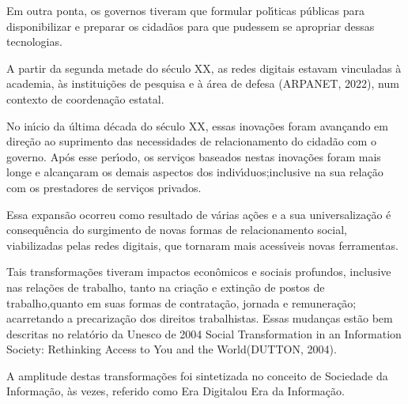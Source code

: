 \documentclass[
12pt,		%
openright,	%
twoside,  %
a4paper,			%
chapter=TITLE,		%
english,			%
french,				%
spanish,			%
brazil				%
]{USPSC-classe/USPSC}
\begin{document}
Em outra ponta, os governos tiveram que formular pol\'{\i}ticas p\'ublicas para disponibilizar e preparar os cidad\~aos para que pudessem se apropriar dessas tecnologias.








A partir da segunda metade do s\'eculo XX, as redes digitais estavam vinculadas \`a academia, \`as institui\c{c}\~oes de pesquisa e \`a \'area de defesa  (ARPANET, 2022), num contexto de coordena\c{c}\~ao estatal.








No in\'{\i}cio da \'ultima d\'ecada do s\'eculo XX, essas inova\c{c}\~oes  foram avan\c{c}ando em dire\c{c}\~ao ao suprimento das necessidades de relacionamento do cidad\~ao com o governo. Ap\'os esse per\'{\i}odo, os servi\c{c}os baseados nestas inova\c{c}\~oes foram mais longe e alcan\c{c}aram  os demais aspectos dos indiv\'{\i}duos;inclusive na sua rela\c{c}\~ao com os prestadores de servi\c{c}os privados.








Essa expans\~ao ocorreu como resultado de v\'arias a\c{c}\~oes e a sua universaliza\c{c}\~ao \'e consequ\^encia do surgimento de novas formas de relacionamento social, viabilizadas pelas redes digitais, que tornaram mais acess\'{\i}veis novas ferramentas.








Tais transforma\c{c}\~oes tiveram impactos econ\^omicos e sociais profundos, inclusive nas rela\c{c}\~oes de trabalho, tanto na cria\c{c}\~ao e extin\c{c}\~ao de postos de trabalho,quanto em suas formas de contrata\c{c}\~ao, jornada e remunera\c{c}\~ao; acarretando a precariza\c{c}\~ao dos direitos trabalhistas. Essas mudan\c{c}as est\~ao bem descritas  no relat\'orio da Unesco  de 2004 \textquotedbl Social Transformation in an Information Society: Rethinking Access to You and the World\textquotedbl  (DUTTON, 2004).








A amplitude destas transforma\c{c}\~oes foi sintetizada no conceito de \textquotedbl Sociedade da Informa\c{c}\~ao\textquotedbl , \`as vezes, referido como \textquotedbl Era Digital\textquotedbl  ou \textquotedbl Era da Informa\c{c}\~ao\textquotedbl .
\end{document}
